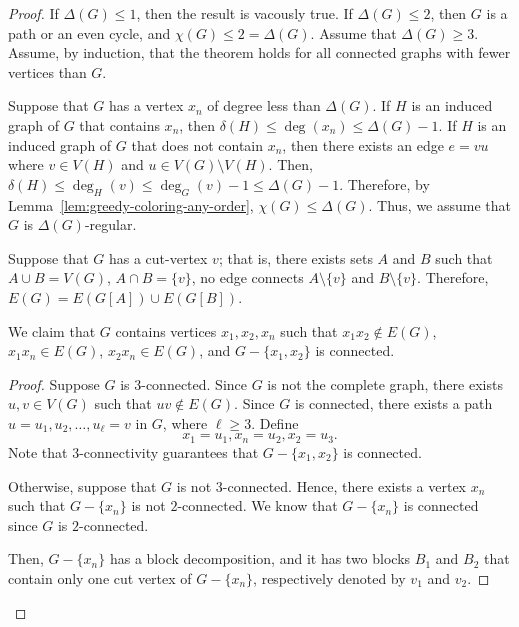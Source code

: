 \begin{proof}
    If \(\Delta(G) \leq 1\), then the result is vacously true.
    If \(\Delta(G) \leq 2\), then \(G\) is a path or an even cycle, and \(\chi(G) \leq 2 = \Delta(G)\).
    Assume that \(\Delta(G) \geq 3\).
    Assume, by induction, that the theorem holds for all connected graphs with fewer vertices than \(G\).

    Suppose that \(G\) has a vertex \(x_n\) of degree less than \(\Delta(G)\).
    If \(H\) is an induced graph of \(G\) that contains \(x_n\),
    then \(\delta(H) \leq \deg(x_n) \leq \Delta(G) - 1\).
    If \(H\) is an induced graph of \(G\) that does not contain \(x_n\),
    then there exists an edge \(e = vu\) where \(v \in V(H)\) and \(u \in V(G) \setminus V(H)\).
    Then, \(\delta(H) \leq \deg_H(v) \leq \deg_G(v) - 1 \leq \Delta(G) - 1\).
    Therefore, by Lemma~\ref{lem:greedy-coloring-any-order},
    \(\chi(G) \leq \Delta(G)\).
    Thus, we assume that \(G\) is \(\Delta(G)\)-regular.

    Suppose that \(G\) has a cut-vertex \(v\); that is, there exists sets \(A\) and \(B\) such that \(A \cup B = V(G)\), \(A \cap B = \{v\}\), no edge connects \(A \setminus \{v\}\) and \(B \setminus \{v\}\).
    Therefore, \(E(G) = E(G[A]) \cup E(G[B])\).

    We claim that \(G\) contains vertices \(x_1, x_2, x_n\) such that \(x_1x_2 \notin E(G)\), \(x_1x_n \in E(G)\), \(x_2x_n \in E(G)\), and \(G - \{x_1, x_2\}\) is connected.
    \begin{proof}
        Suppose \(G\) is \(3\)-connected.
        Since \(G\) is not the complete graph,
        there exists \(u, v \in V(G)\) such that \(uv \notin E(G)\).
        Since \(G\) is connected, there exists a path \(u = u_1, u_2, \ldots, u_\ell = v\) in \(G\), where \(\ell \geq 3\).
        Define
        \begin{equation}
            x_1 = u_1, x_n = u_2, x_2 = u_3.
        \end{equation}
        Note that \(3\)-connectivity guarantees that \(G - \{x_1, x_2\}\) is connected.

        Otherwise, suppose that \(G\) is not \(3\)-connected.
        Hence, there exists a vertex \(x_n\) such that \(G - \{x_n\}\) is not \(2\)-connected.
        We know that \(G - \{x_n\}\) is connected since \(G\) is \(2\)-connected.

        Then, \(G - \{x_n\}\) has a block decomposition, and it has two blocks \(B_1\) and \(B_2\) that contain only one cut vertex of \(G - \{x_n\}\), respectively denoted by \(v_1\) and \(v_2\).


\end{proof}
\end{proof}
